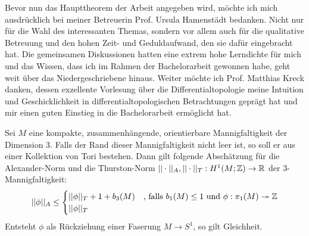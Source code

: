     Bevor nun das Haupttheorem der Arbeit angegeben wird, möchte ich mich ausdrücklich bei meiner Betreuerin Prof. Ursula Hamenstädt bedanken. Nicht nur für die Wahl des interessanten Themas, sondern vor allem auch für die qualitative Betreuung und den hohen Zeit- und Geduldaufwand, den sie dafür eingebracht hat. Die gemeinsamen Diskussionen hatten eine extrem hohe Lerndichte für mich und das Wissen, dass ich im Rahmen der Bachelorarbeit gewonnen habe, geht weit über das Niedergeschriebene hinaus. Weiter möchte ich Prof. Matthias Kreck danken, dessen exzellente Vorlesung über die Differentialtopologie meine Intuition und Geschicklichkeit in differentialtopologischen Betrachtungen geprägt hat und mir einen guten Einstieg in die Bachelorarbeit ermöglicht hat.

    \begin{thm}[McMullen]
    \label{thm:haupttheorem}
    	Sei $M$ eine kompakte, zusammenhängende, orientierbare Mannigfaltigkeit der Dimension 3. Falls der Rand dieser Mannigfaltigkeit nicht leer ist, so soll er aus einer Kollektion von Tori bestehen. Dann gilt folgende Abschätzung für die Alexander-Norm und die Thurston-Norm $||\cdot||_A ,||\cdot||_T : H^1(M;\mathbb{Z}) \to \mathbb{R}$ der 3-Mannigfaltigkeit:
    	\[
    		||\phi||_A \leq 
    		\begin{cases}
    			||\phi||_T + 1+ b_3(M) &\text{, falls } b_1(M)\leq 1 \text{ und } \phi: \pi_1(M) \twoheadrightarrow \mathbb{Z} \\
    			||\phi||_T &
    		\end{cases}
    	\]
    	Entsteht $\phi$ als Rückziehung einer Faserung $M\to S^1$, so gilt Gleichheit.
    \end{thm}